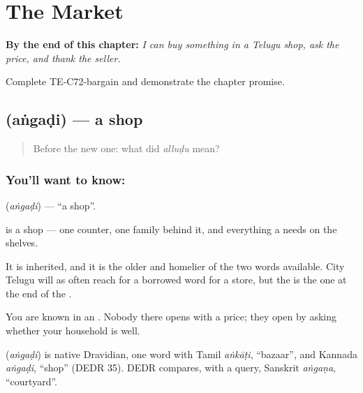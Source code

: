
\chapter{The Market}
\label{ch:te-the-market}

\begin{chapteropening}
\textbf{By the end of this chapter:} \emph{I can buy something in a Telugu shop, ask the price, and thank the seller.}

Complete TE-C72-bargain and demonstrate the chapter promise.
\end{chapteropening}

\section[\texorpdfstring{\te{అంగడి} (aṅgaḍi)}{అంగడి (aṅgaḍi)}]{ (aṅgaḍi) — a shop}

\label{lesson:TE-C72-shop}



\begin{quote}
Before the new one: what did \emph{alluḍu} mean?
\end{quote}

\subsection*{You'll want to know: }
\textbf{} (\emph{aṅgaḍi}) — \textquotedblleft{}a shop\textquotedblright{}.

 is a shop — one counter, one family behind it, and everything a  needs on the shelves.

It is inherited, and it is the older and homelier of the two words available. City Telugu will as often reach for a borrowed word for a store, but the  is the one at the end of the .

You are known in an . Nobody there opens with a price; they open by asking whether your household is well.

\begin{cousinweb}
\textbf{} (\emph{aṅgaḍi}) is native Dravidian, one word with Tamil \emph{aṅkāṭi}, \textquotedblleft{}bazaar\textquotedblright{}, and Kannada \emph{aṅgaḍi}, \textquotedblleft{}shop\textquotedblright{} (DEDR 35). DEDR compares, with a query, Sanskrit \emph{aṅgaṇa}, \textquotedblleft{}courtyard\textquotedblright{}.
\end{cousinweb}

